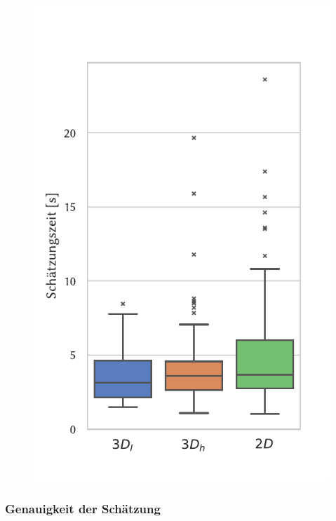 \begin{figure}
    \centering
    \includegraphics[height=0.45\textheight]{figures/analysis/pointing_time}
    \caption{}
    \label{fig:pointing_time}
\end{figure}

\subsubsection*{Genauigkeit der Schätzung}

